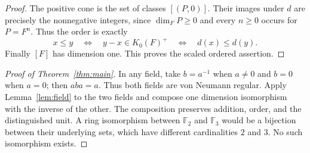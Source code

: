 \documentclass[11pt]{article}
\newcommand{\Fp}{\mathbb F}
\begin{document}
\begin{proof}
The positive cone is the set of classes $[(P,0)]$. Their images under $d$
are precisely the nonnegative integers, since $\dim_F P\geq0$ and every
$n\geq0$ occurs for $P=F^n$. Thus the order is exactly
\[
 x\leq y\quad\Longleftrightarrow\quad y-x\in K_0(F)^+
 \quad\Longleftrightarrow\quad d(x)\leq d(y).
\]
Finally $[F]$ has dimension one. This proves the scaled ordered assertion.
\end{proof}

\begin{proof}[Proof of Theorem~\ref{thm:main}]
In any field, take $b=a^{-1}$ when $a\neq0$ and $b=0$ when $a=0$;
then $aba=a$. Thus both fields are von Neumann regular.
Apply Lemma~\ref{lem:field} to the two fields and compose one dimension
isomorphism with the inverse of the other. The composition preserves
addition, order, and the distinguished unit. A ring isomorphism between
$\Fp_2$ and $\Fp_3$ would be a bijection between their underlying sets,
which have different cardinalities $2$ and $3$. No such isomorphism exists.
\end{proof}
\end{document}
